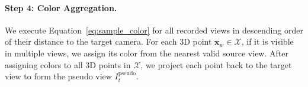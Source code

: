 \paragraph{Step 4: Color Aggregation.} 
We execute Equation~\ref{eq:sample_color} for all recorded views in descending order of their distance to the target camera. For each 3D point $\mathbf{x}_w \in \mathcal{X}$, if it is visible in multiple views,  we assign its color from the nearest valid source view. 
After assigning colors to all 3D points in $\mathcal{X}$, we project each point back to the target view to form the pseudo view $I_t^{\text{pseudo}}$. 









